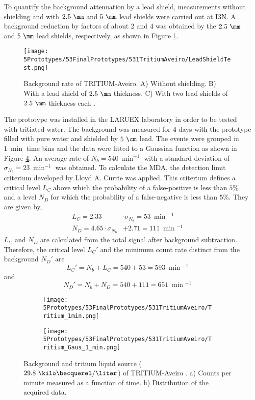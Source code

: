 To quantify the background attenuation by a lead shield, measurements without shielding and with $2.5~\mm$ and $5~\mm$ lead shields were carried out at I3N. A background reduction by factors of about 2 and 4 was obtained by the $2.5~\mm$ and $5~\mm$ lead shields, respectively, as shown in Figure \ref{fig:LeadShieldTest}.
\begin{figure}[h]
\centering
\texttt{[image: 5Prototypes/53FinalPrototypes/531TritiumAveiro/LeadShieldTest.png]}
\caption{Background rate of TRITIUM-Aveiro. A) Without shielding. B) With a lead shield of $2.5~\mm$ thickness. C) With two lead shields of $2.5~\mm$ thickness each \cite{ExperimentalPaperCarlos}.\label{fig:LeadShieldTest}}
\end{figure}

The prototype was installed in the LARUEX laboratory in order to be tested with tritiated water. The background was measured for 4 days with the prototype filled with pure water and shielded by $5~\cm$ lead. The events were grouped in $1~\min$ time bins and the data were fitted to a Gaussian function as shown in Figure \ref{fig:BackgroundTritium1min}. An average rate of $N_b = 540~\min^{-1}$ with a standard deviation of $\sigma_{N_b}=23~\min^{-1}$ was obtained. To calculate the MDA, the detection limit criterium developed by Lloyd A. Currie \cite{Knoll} was applied. This criterium defines a critical level $L_C$ above which the probability of a false-positive is less than $5\%$ and a level $N_D$ for which the probability of a false-negative is less than $5\%$. They are given by,
\begin{equation}
  \begin{aligned}
L_C = 2.33&\cdot{}\sigma_{N_b}=53 ~\min{}^{-1}\\
N_D = 4.65 \cdot{}\sigma_{N_b}& + 2.71 = 111~\min{}^{-1}
 \end{aligned}\label{eq:EquationNetCounts}
\end{equation}
$L_C$ and $N_D$ are calculated from the total signal after background subtraction. Therefore, the critical level $L_C'$ and the minimum count rate distinct from the background $N_D'$ are $$L_C'= N_b + L_C = 540 + 53 = 593~\min{}^{-1}$$ and $$N_D'= N_b + N_D = 540 + 111=651~\min{}^{-1}$$
\begin{figure}
\centering
    \begin{subfigure}[b]{0.55\textwidth}
    \centering
    \texttt{[image: 5Prototypes/53FinalPrototypes/531TritiumAveiro/Tritium\_1min.png]}  
    \caption{\label{subfig:MeasurementInRealTime}}
    \end{subfigure}
    \hfill
    \begin{subfigure}[b]{0.55\textwidth}
    \centering
    \texttt{[image: 5Prototypes/53FinalPrototypes/531TritiumAveiro/Tritium\_Gaus\_1\_min.png]}  
    \caption{\label{subfig:DistributionofMeasurement}}
    \end{subfigure}
 \caption{Background and tritium liquid source ($29.8~\kilo\becquerel/\liter$) of TRITIUM-Aveiro \cite{ExperimentalPaperCarlos}. a) Counts per minute measured as a function of time. b) Distribution of the acquired data.}
 \label{fig:BackgroundTritium1min}
\end{figure}
